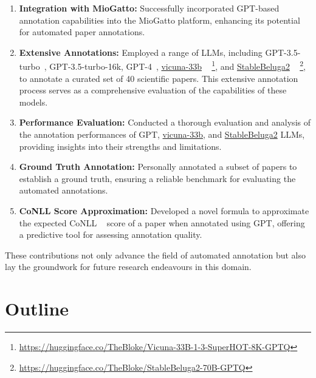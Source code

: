 \begin{enumerate}
    \item \textbf{Integration with MioGatto:} Successfully incorporated GPT-based annotation capabilities into the MioGatto platform, enhancing its potential for automated paper annotations.
    
    \item \textbf{Extensive Annotations:} Employed a range of LLMs, including GPT-3.5-turbo~\citep{openai2023}, GPT-3.5-turbo-16k, GPT-4~\citep{2303.08774}, \href{https://huggingface.co/TheBloke/Vicuna-33B-1-3-SuperHOT-8K-GPTQ}{vicuna-33b} ~\citep{zheng2023judging} \footnote{\url{https://huggingface.co/TheBloke/Vicuna-33B-1-3-SuperHOT-8K-GPTQ}}, and \href{https://huggingface.co/TheBloke/StableBeluga2-70B-GPTQ}{StableBeluga2} ~\citep{StableBelugaModels, touvron2023llama, mukherjee2023orca} \footnote{\url{https://huggingface.co/TheBloke/StableBeluga2-70B-GPTQ}}, to annotate a curated set of 40 scientific papers. This extensive annotation process serves as a comprehensive evaluation of the capabilities of these models.
    
    \item \textbf{Performance Evaluation:} Conducted a thorough evaluation and analysis of the annotation performances of GPT, \href{https://huggingface.co/TheBloke/Vicuna-33B-1-3-SuperHOT-8K-GPTQ}{vicuna-33b}, and \href{https://huggingface.co/TheBloke/StableBeluga2-70B-GPTQ}{StableBeluga2} LLMs, providing insights into their strengths and limitations.
    
    \item \textbf{Ground Truth Annotation:} Personally annotated a subset of papers to establish a ground truth, ensuring a reliable benchmark for evaluating the automated annotations.
    
    \item \textbf{CoNLL Score Approximation:} Developed a novel formula to approximate the expected CoNLL ~\citep{pradhan2012conll} score of a paper when annotated using GPT, offering a predictive tool for assessing annotation quality.
\end{enumerate}

These contributions not only advance the field of automated annotation but also lay the groundwork for future research endeavours in this domain.

\section{Outline}

